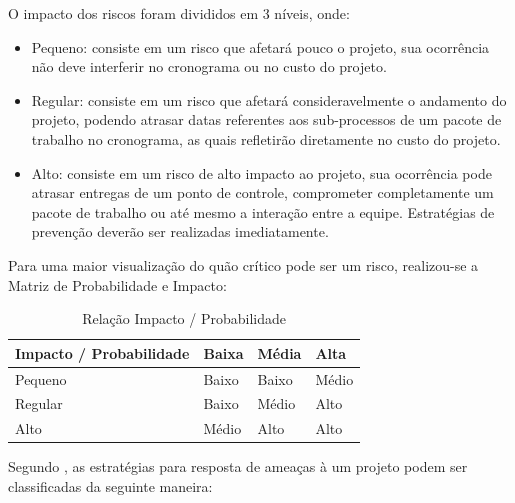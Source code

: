   O impacto dos riscos foram divididos em 3 níveis, onde:

  \begin{itemize}
    \item Pequeno: consiste em um risco que afetará pouco o projeto, sua ocorrência não deve interferir no cronograma ou no
    custo do projeto.
    \item Regular: consiste em um risco que afetará consideravelmente o andamento do projeto, podendo atrasar datas referentes
    aos sub-processos de um pacote de trabalho no cronograma, as quais refletirão diretamente no custo do projeto.
    \item Alto: consiste em um risco de alto impacto ao projeto, sua ocorrência pode atrasar entregas de um ponto de controle,
    comprometer completamente um pacote de trabalho ou até mesmo a interação entre a equipe. Estratégias de prevenção deverão
    ser realizadas imediatamente.
  \end{itemize}

  Para uma maior visualização do quão crítico pode ser um risco, realizou-se a Matriz de Probabilidade e Impacto:

  \begin{table}[!htbp]
    \begin{center}
    \caption{\label{impactoporprobabilidade}Relação Impacto / Probabilidade}
    \begin{tabular}{|l|l|l|l|}
    \hline
    \textbf{Impacto / Probabilidade} & \textbf{Baixa} & \textbf{Média} & \textbf{Alta} \\ \hline\hline
    Pequeno                          & Baixo          & Baixo          & Médio         \\ \hline
    Regular                          & Baixo          & Médio          & Alto          \\ \hline
    Alto                             & Médio          & Alto           & Alto          \\ \hline
    \end{tabular}
    \end{center}
  \end{table}

  Segundo \cite{scofanogestao}, as estratégias para resposta de ameaças à um projeto podem ser classificadas da seguinte maneira:

